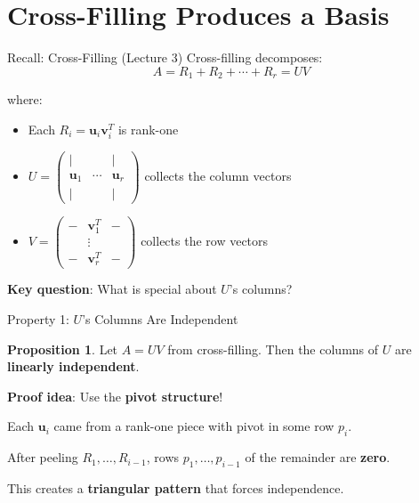 \documentclass[10pt]{beamer}
\theoremstyle{definition}
\newtheorem{prop}{Proposition}[section]
\newcommand{\x}[1]{\alert{\textbf{#1}}}
\begin{document}
\section{Cross-Filling Produces a Basis}

\begin{frame}{Recall: Cross-Filling (Lecture 3)}
Cross-filling decomposes:
$$A = R_1 + R_2 + \cdots + R_r = UV$$

where:
\begin{itemize}
\item Each $R_i = \mathbf{u}_i\mathbf{v}_i^T$ is rank-one
\item $U = \begin{pmatrix} | & & | \\ \mathbf{u}_1 & \cdots & \mathbf{u}_r \\ | & & | \end{pmatrix}$ collects the column vectors
\item $V = \begin{pmatrix} - & \mathbf{v}_1^T & - \\ & \vdots & \\ - & \mathbf{v}_r^T & - \end{pmatrix}$ collects the row vectors
\end{itemize}

\vfill
\x{Key question}: What is special about $U$'s columns?
\end{frame}

\begin{frame}{Property 1: $U$'s Columns Are Independent}
\begin{prop}
Let $A = UV$ from cross-filling. Then the columns of $U$ are \x{linearly independent}.
\end{prop}

\vfill
\textbf{Proof idea}: Use the \x{pivot structure}!

Each $\mathbf{u}_i$ came from a rank-one piece with pivot in some row $p_i$.

After peeling $R_1, \ldots, R_{i-1}$, rows $p_1, \ldots, p_{i-1}$ of the remainder are \x{zero}.

This creates a \x{triangular pattern} that forces independence.
\end{frame}
\end{document}
